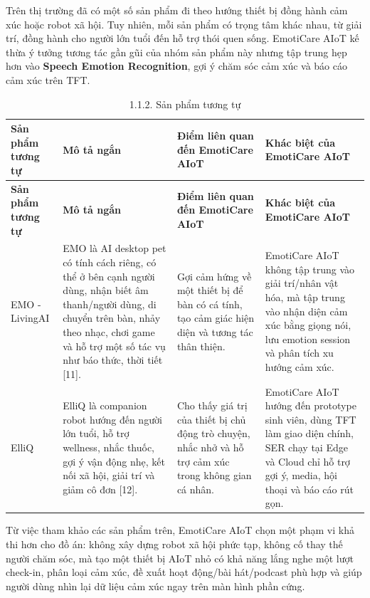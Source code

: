 \documentclass[12pt,a4paper]{article}
\begin{document}
Trên thị trường đã có một số sản phẩm đi theo hướng thiết bị đồng hành cảm xúc hoặc robot xã hội. Tuy nhiên, mỗi sản phẩm có trọng tâm khác nhau, từ giải trí, đồng hành cho người lớn tuổi đến hỗ trợ thói quen sống. EmotiCare AIoT kế thừa ý tưởng tương tác gần gũi của nhóm sản phẩm này nhưng tập trung hẹp hơn vào \textbf{Speech Emotion Recognition}, gợi ý chăm sóc cảm xúc và báo cáo cảm xúc trên TFT.


\begin{center}
\scriptsize
\begin{longtable}{|P{0.18\textwidth}|P{0.25\textwidth}|P{0.25\textwidth}|P{0.22\textwidth}|}
\caption{1.1.2. Sản phẩm tương tự}\\
\hline
\textbf{Sản phẩm tương tự} & \textbf{Mô tả ngắn} & \textbf{Điểm liên quan đến EmotiCare AIoT} & \textbf{Khác biệt của EmotiCare AIoT} \\
\hline
\endfirsthead
\hline
\textbf{Sản phẩm tương tự} & \textbf{Mô tả ngắn} & \textbf{Điểm liên quan đến EmotiCare AIoT} & \textbf{Khác biệt của EmotiCare AIoT} \\
\hline
\endhead
EMO - LivingAI & EMO là AI desktop pet có tính cách riêng, có thể ở bên cạnh người dùng, nhận biết âm thanh/người dùng, di chuyển trên bàn, nhảy theo nhạc, chơi game và hỗ trợ một số tác vụ như báo thức, thời tiết [11]. & Gợi cảm hứng về một thiết bị để bàn có cá tính, tạo cảm giác hiện diện và tương tác thân thiện. & EmotiCare AIoT không tập trung vào giải trí/nhân vật hóa, mà tập trung vào nhận diện cảm xúc bằng giọng nói, lưu emotion session và phân tích xu hướng cảm xúc. \\
\hline
ElliQ & ElliQ là companion robot hướng đến người lớn tuổi, hỗ trợ wellness, nhắc thuốc, gợi ý vận động nhẹ, kết nối xã hội, giải trí và giảm cô đơn [12]. & Cho thấy giá trị của thiết bị chủ động trò chuyện, nhắc nhở và hỗ trợ cảm xúc trong không gian cá nhân. & EmotiCare AIoT hướng đến prototype sinh viên, dùng TFT làm giao diện chính, SER chạy tại Edge và Cloud chỉ hỗ trợ gợi ý, media, hội thoại và báo cáo rút gọn. \\
\hline
\end{longtable}
\normalsize
\end{center}

Từ việc tham khảo các sản phẩm trên, EmotiCare AIoT chọn một phạm vi khả thi hơn cho đồ án: không xây dựng robot xã hội phức tạp, không cố thay thế người chăm sóc, mà tạo một thiết bị AIoT nhỏ có khả năng lắng nghe một lượt check-in, phân loại cảm xúc, đề xuất hoạt động/bài hát/podcast phù hợp và giúp người dùng nhìn lại dữ liệu cảm xúc ngay trên màn hình phần cứng.
\end{document}
